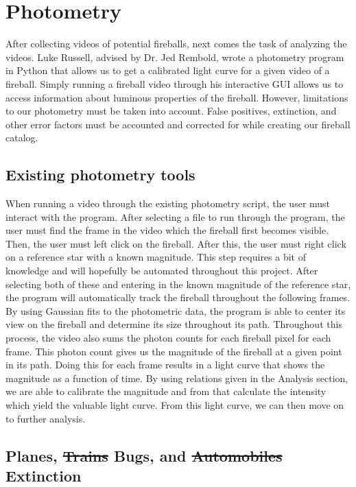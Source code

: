 \section{Photometry}
After collecting videos of potential fireballs, next comes the task of analyzing the videos.
Luke Russell, advised by Dr. Jed Rembold, wrote a photometry program in Python that allows us to get a calibrated light curve for a given video of a fireball.
Simply running a fireball video through his interactive GUI allows us to access information about luminous properties of the fireball.
However, limitations to our photometry must be taken into account.
False positives, extinction, and other error factors must be accounted and corrected for while creating our fireball catalog.

\subsection{Existing photometry tools}
When running a video through the existing photometry script, the user must interact with the program.
After selecting a file to run through the program, the user must find the frame in the video which the fireball first becomes visible.
Then, the user must left click on the fireball.
After this, the user must right click on a reference star with a known magnitude.
This step requires a bit of knowledge and will hopefully be automated throughout this project.
After selecting both of these and entering in the known magnitude of the reference star, the program will automatically track the fireball throughout the following frames.
By using Gaussian fits to the photometric data, the program is able to center its view on the fireball and determine its size throughout its path.
Throughout this process, the video also sums the photon counts for each fireball pixel for each frame.
This photon count gives us the magnitude of the fireball at a given point in its path.
Doing this for each frame results in a light curve that shows the magnitude as a function of time.  
By using relations given in the Analysis section, we are able to calibrate the magnitude and from that calculate the intensity which yield the valuable light curve.
From this light curve, we can then move on to further analysis.

\subsection{Planes, \st{Trains} Bugs, and \st{Automobiles} Extinction}

